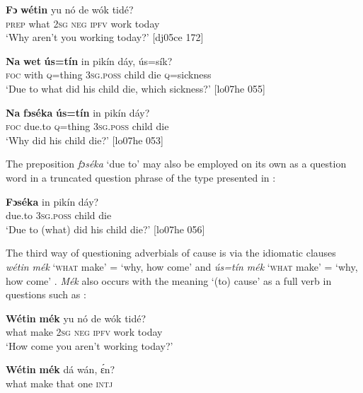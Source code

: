 \ea%
    \label{ex:key:642}
    \gll \textbf{Fɔ}  \textbf{wétin}  yu  nó  de  wók    tidé?\\
\textsc{prep} what \textsc{2sg} \textsc{neg} \textsc{ipfv} work  today\\

\glt ‘Why aren’t you working today?’ [dj05ce 172]
\z


\ea%
    \label{ex:key:643}
    \gll \textbf{Na}  \textbf{wet}    \textbf{ús=tín}  in    pikín  dáy,    ús=sík?\\
\textsc{foc}  with    \textsc{q}=thing  \textsc{3sg.poss}  child  die    \textsc{q}=sickness\\

\glt ‘Due to what did his child die, which sickness?’ [lo07he 055]
\z


\ea%
    \label{ex:key:644}
    \gll \textbf{Na}  \textbf{fɔséka}  \textbf{ús=tín}  in   pikín  dáy?\\
\textsc{foc}  due.to  \textsc{q}=thing  \textsc{3sg.poss}  child  die\\

\glt ‘Why did his child die?’ [lo07he 053]
\z

The preposition \textit{fɔséka} ‘due to’ may also be employed on its own as a question word in a truncated question phrase of the type presented in :


\ea%
    \label{ex:key:645}
    \gll \textbf{Fɔséka}  in    pikín  dáy?\\
due.to  \textsc{3sg.poss}  child  die\\

\glt ‘Due to (what) did his child die?’ [lo07he 056]
\z

The third way of questioning adverbials of cause is via the idiomatic clauses \textit{wétin mék} ‘\textsc{what} make’ = ‘why, how come’ and \textit{ús=tín mék} \textsc{‘what} make’ \textsc{=} \textsc{‘}why, how come’ . \textit{Mék} also occurs with the meaning ‘(to) cause’ as a full verb in questions such as :


\ea%
    \label{ex:key:646}
    \gll \textbf{Wétin}  \textbf{mék}    yu  nó  de  wók    tidé?\\
what  make  \textsc{2sg}  \textsc{neg}  \textsc{ipfv}  work  today\\

\glt ‘How come you aren’t working today?’\textstylePichiglossZchn{ [ro05ee 016]}
\z


\ea%
    \label{ex:key:647}
    \gll \textbf{Wétin}  \textbf{mék}    dá  wán,  ɛ́n?\\
what  make  that  one    \textsc{intj}\\

